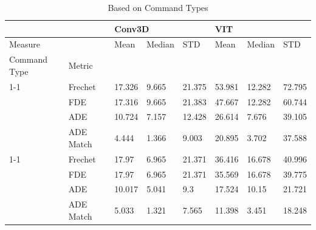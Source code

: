 \documentclass[11pt]{article}
\begin{document}
\begin{table}[]
\centering
\begin{tabular}{@{}llllllll@{}}
\toprule
                                                      &           & \multicolumn{3}{l}{Conv3D} & \multicolumn{3}{l}{VIT}  \\ \midrule
Measure                                               &           & Mean    & Median  & STD    & Mean   & Median & STD    \\
\multicolumn{1}{l|}{Command Type}                    & Metric    &         &         &        &        &        &        \\ \cline{1-1}
\multicolumn{1}{l|}{\multirow{4}{*}{Stopping Based}} & Frechet   & 17.326  & 9.665   & 21.375 & 53.981 & 12.282 & 72.795 \\
\multicolumn{1}{l|}{}                                & FDE       & 17.316  & 9.665   & 21.383 & 47.667 & 12.282 & 60.744 \\
\multicolumn{1}{l|}{}                                & ADE       & 10.724  & 7.157   & 12.428 & 26.614 & 7.676  & 39.105 \\
\multicolumn{1}{l|}{}                                & ADE Match & 4.444   & 1.366   & 9.003  & 20.895 & 3.702  & 37.588 \\ \cline{1-1}
\multicolumn{1}{l|}{\multirow{4}{*}{Turning Based}}  & Frechet   & 17.97   & 6.965   & 21.371 & 36.416 & 16.678 & 40.996 \\
\multicolumn{1}{l|}{}                                & FDE       & 17.97   & 6.965   & 21.371 & 35.569 & 16.678 & 39.775 \\
\multicolumn{1}{l|}{}                                & ADE       & 10.017  & 5.041   & 9.3    & 17.524 & 10.15  & 21.721 \\
\multicolumn{1}{l|}{}                                & ADE Match & 5.033   & 1.321   & 7.565  & 11.398 & 3.451  & 18.248 \\ \bottomrule
\end{tabular}

    \caption{Based on Command Types}
    \label{fig:ablations_1}
\end{table}
\end{document}
